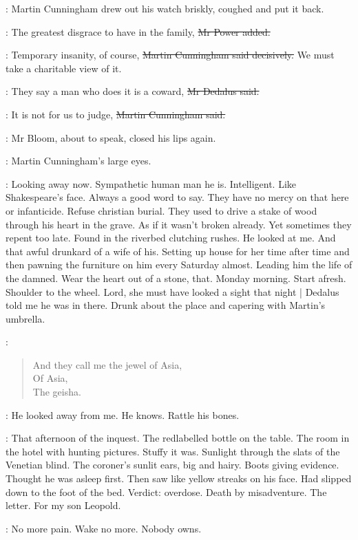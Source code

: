 :
Martin Cunningham drew out his watch briskly,
coughed and put it back.

\power:
The greatest disgrace to have in the family,
\sout{Mr Power added.}

\cunningham:
Temporary insanity, of course,
\sout{Martin Cunningham said decisively.}
We must take
a charitable view of it.

\simon:
They say a man who does it is a coward,
\sout{Mr Dedalus said.}

\cunningham:
It is not for us to judge,
\sout{Martin Cunningham said.}

:
Mr Bloom, about to speak, closed his lips again.

\BloomInt:
Martin Cunningham's large eyes.

\BloomInt:
Looking away now.
Sympathetic human man he is.
Intelligent.
Like Shakespeare's face.
Always a good word to say.
They have no mercy on that here or infanticide.
Refuse christian burial.
They used to drive a stake of wood through his heart in the grave.
As if it wasn't broken already.
Yet sometimes they repent too late.
Found in the riverbed clutching rushes.
He looked at me.
And that awful drunkard of a wife of his.
Setting up house for her time after time
and then pawning the furniture on him every Saturday almost.
Leading him the life of the damned.
Wear the heart out of a stone, that.
Monday morning.
Start afresh.
Shoulder to the wheel.
Lord, she must have looked a sight that night |
Dedalus told me he was in there.
Drunk about the place and capering with Martin's umbrella.

\BloomInt:
\begin{verse}
    And they call me the jewel of Asia, \\
    Of Asia, \\
    The geisha.
\end{verse}

\BloomInt:
He looked away from me.
He knows.
Rattle his bones.

\BloomInt:
That afternoon of the inquest.
The redlabelled bottle on the table.
The room in the hotel with hunting pictures.
Stuffy it was.
Sunlight through the slats of the Venetian blind.
The coroner's sunlit ears, big and hairy.
Boots giving evidence.
Thought he was asleep first.
Then saw like yellow streaks on his face.
Had slipped down to the foot of the bed.
Verdict:
overdose.
Death by misadventure.
The letter.
For my son Leopold.

\BloomInt:
No more pain.
Wake no more.
Nobody owns.

